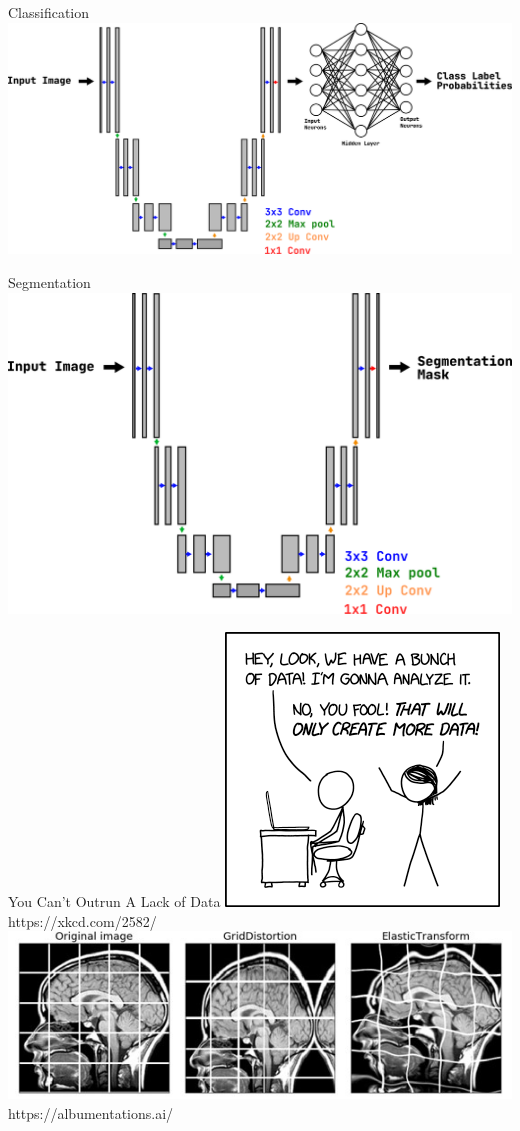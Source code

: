 
\begin{frame}{Classification}
   \centering
   \includegraphics[width=0.8\linewidth]{images/classification.png}
\end{frame}

\begin{frame}{Segmentation}
   \centering
   \includegraphics[width=0.8\linewidth]{images/segmentation.png}
\end{frame}


\begin{frame}{You Can't Outrun A Lack of Data}
   \centering
   \includegraphics[width=0.25\linewidth]{images/data_trap.png}
   \vfill \tiny{https://xkcd.com/2582/}
   \vfill
   \includegraphics[width=0.7\linewidth]{images/augmentations.jpg}
   \vfill \tiny{https://albumentations.ai/}

\end{frame}

